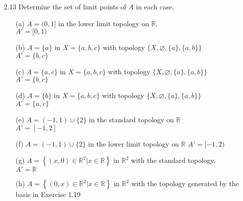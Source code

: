 \documentclass[12pt]{article}
\newcommand{\R}{\mathbb{R}}
\begin{document}
\begin{enumerate}
		\item[2.13] Determine the set of limit points of $ A $ in each case.
		\begin{enumerate}
			\item[(a)] $A=(0,1]$ in the lower limit topology on $\mathbb{R}$.\\
			$ A'=[0,1) $
			\item[(b)] $A=\{a\}$ in $X=\{a, b, c\}$ with topology $\{X, \varnothing,\{a\},\{a, b\}\}$\\
			$ A' = \{b,c\} $
			\item[(c)] $A=\{a, c\}$ in $X=\{a, b, c\}$ with topology $\{X, \varnothing,\{a\},\{a, b\}\}$\\
			$ A' = \{b,c\} $
			\item[(d)] $A=\{b\}$ in $X=\{a, b, c\}$ with topology $\{X, \varnothing,\{a\},\{a, b\}\}$\\
			$ A' = \{a,c\} $
			\item[(e)] $ A=(-1,1) \cup\{2\}$ in the standard topology on $\mathbb{R}$\\
			$ A'=[-1,2] $
			\item[(f)] $A=(-1,1) \cup\{2\}$ in the lower limit topology on $\mathbb{R}$
			$ A'=[-1,2) $
			\item[(g)] $A=\left\{(x, 0) \in \mathbb{R}^{2} | x \in \mathbb{R}\right\}$ in $\mathbb{R}^{2}$ with the standard topology.\\
			$ A' = \R $
			\item[(h)] $A=\left\{(0, x) \in \mathbb{R}^{2} | x \in \mathbb{R}\right\}$ in $\mathbb{R}^{2}$ with the topology generated by the basis in Exercise 1.19\\
			

\end{enumerate}
\end{enumerate}
\end{document}
